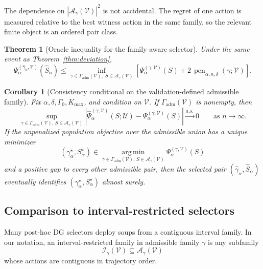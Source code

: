 \documentclass{article}
\newtheorem{theorem}{Theorem}
\newtheorem{corollary}{Corollary}
\newcommand{\cA}{\mathcal{A}}
\newcommand{\cI}{\mathcal{I}}
\newcommand{\cU}{\mathcal{U}}
\newcommand{\cV}{\mathcal{V}}
\newcommand{\argmin}{\operatorname*{arg\,min}}
\newcommand{\bracks}[1]{\left[ #1 \right]}
\newcommand{\1}{\mathbbm{1}}
\begin{document}
The dependence on \(|\cA_\gamma(\cV)|^2\) is not accidental. The regret of one action is measured relative to the best witness action in the same family, so the relevant finite object is an ordered pair class.

\begin{theorem}[Oracle inequality for the family-aware selector]
\label{thm:oracle}
Under the same event as Theorem~\ref{thm:deviation},
\begin{equation}
    \Psi^{(\widehat{\gamma}_\alpha,\cV)}_\alpha(\widehat{S}_\alpha)
    \le
    \inf_{\gamma\in\Gamma_{\mathrm{adm}}(\cV),\;S\in\cA_\gamma(\cV)}
    \bracks{
        \Psi^{(\gamma,\cV)}_\alpha(S)
        +
        2\,\operatorname{pen}_{\alpha,n,\delta}(\gamma;\cV)
    }.
    \label{eq:oracle}
\end{equation}
\end{theorem}

\begin{corollary}[Consistency conditional on the validation-defined admissible family]
\label{cor:consistency}
Fix \(\alpha,\delta,\Gamma_0,K_{\max}\), and condition on \(\cV\). If \(\Gamma_{\mathrm{adm}}(\cV)\) is nonempty, then
\begin{equation}
    \sup_{\gamma\in\Gamma_{\mathrm{adm}}(\cV),\,S\in\cA_\gamma(\cV)}
    \left|
        \widehat{\Psi}^{(\gamma,\cV)}_\alpha(S;\cU)
        -
        \Psi^{(\gamma,\cV)}_\alpha(S)
    \right|
    \xrightarrow[]{a.s.} 0
    \qquad \text{as } n\to\infty.
    \label{eq:consistency}
\end{equation}
If the unpenalized population objective over the admissible union has a unique minimizer
\[
    (\gamma^\star_\alpha,S^\star_\alpha)
    \in
    \argmin_{\gamma\in\Gamma_{\mathrm{adm}}(\cV),\,S\in\cA_\gamma(\cV)}
    \Psi^{(\gamma,\cV)}_\alpha(S)
\]
and a positive gap to every other admissible pair, then the selected pair \((\widehat{\gamma}_\alpha,\widehat{S}_\alpha)\) eventually identifies \((\gamma^\star_\alpha,S^\star_\alpha)\) almost surely.
\end{corollary}

\subsection{Comparison to interval-restricted selectors}

Many post-hoc DG selectors deploy soups from a contiguous interval family. In our notation, an interval-restricted family in admissible family \(\gamma\) is any subfamily
\begin{equation}
    \cI_\gamma(\cV)
    \subseteq
    \cA_\gamma(\cV)
    \label{eq:interval_subfamily}
\end{equation}
whose actions are contiguous in trajectory order.
\end{document}
